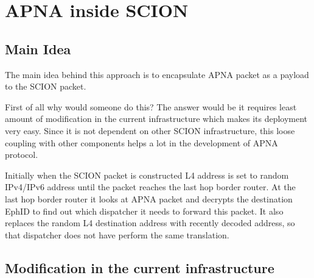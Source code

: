 
\chapter{APNA inside SCION} %

\label{apna_overlay}

\section{Main Idea}

The main idea behind this approach is to encapsulate APNA packet as a payload to the SCION packet. 

First of all why would someone do this? The answer would be it requires least amount of modification in the current infrastructure which makes its deployment very easy. Since it is not dependent on other SCION infrastructure, this loose coupling with other components helps a lot in the development of APNA protocol.

Initially when the SCION packet is constructed L4 address is set to random IPv4/IPv6 address until the packet reaches the last hop border router. At the last hop border router it looks at APNA packet and decrypts the destination EphID to find out which dispatcher it needs to forward this packet. It also replaces the random L4 destination address with recently decoded address, so that dispatcher does not have perform the same translation.

\section{Modification in the current infrastructure}
